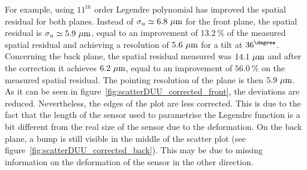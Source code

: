       For example, using $11^{th}$ order Legendre polynomial has improved the spatial residual for both planes. 
      Instead of $\sigma_{u} \simeq 6.8~\rm{\mu m}$ for the front plane, the spatial residual is $\sigma_{u} \simeq 5.9~\rm{\mu m}$, equal to an improvement of $13.2~\%$ of the measured spatial residual and achieving a resolution of $5.6~\rm{\mu m}$ for a tilt at $36^{\degree}$.
      Concerning the back plane, the spatial residual measured was $14.1~\rm{\mu m}$ and after the correction it achieves $6.2~\rm{\mu m}$, equal to an improvement of $56.0~\%$ on the measured spatial residual.
      The pointing resolution of the plane is then $5.9~\rm{\mu m}$.
      As it can be seen in figure~\ref{fig:scatterDUU_corrected_front}, the deviations are reduced. 
      Nevertheless, the edges of the plot are less corrected.
      This is due to the fact that the length of the sensor used to parametrise the Legendre function is a bit different from the real size of the sensor due to the deformation.
      On the back plane, a bump is still visible in the middle of the scatter plot (see figure~\ref{fig:scatterDUU_corrected_back}).
      This may be due to missing information on the deformation of the sensor in the other direction.

